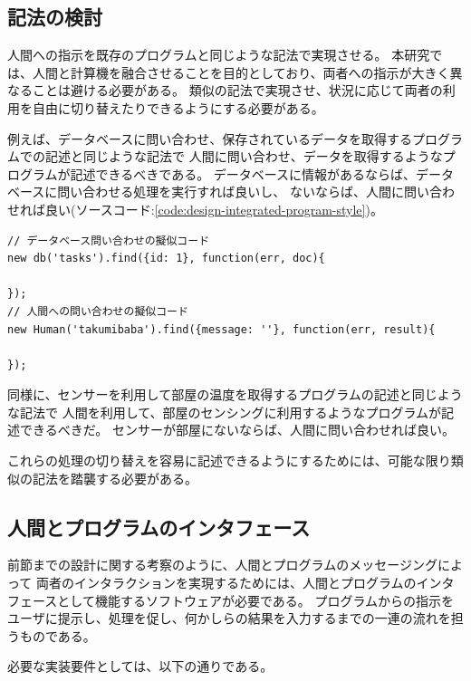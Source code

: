 \subsection{記法の検討}\label{ux8a18ux6cd5ux306eux691cux8a0e}

人間への指示を既存のプログラムと同じような記法で実現させる。
本研究では、人間と計算機を融合させることを目的としており、両者への指示が大きく異なることは避ける必要がある。
類似の記法で実現させ、状況に応じて両者の利用を自由に切り替えたりできるようにする必要がある。

例えば、データベースに問い合わせ、保存されているデータを取得するプログラムでの記述と同じような記法で
人間に問い合わせ、データを取得するようなプログラムが記述できるべきである。
データベースに情報があるならば、データベースに問い合わせる処理を実行すれば良いし、
ないならば、人間に問い合わせれば良い(ソースコード:\ref{code:design-integrated-program-style})。

\begin{lstlisting}[caption=人間への指示を計算機への指示と類似させる, label=code:design-integrated-program-style]
// データベース問い合わせの擬似コード
new db('tasks').find({id: 1}, function(err, doc){

});
// 人間への問い合わせの擬似コード
new Human('takumibaba').find({message: ''}, function(err, result){

});
\end{lstlisting}

同様に、センサーを利用して部屋の温度を取得するプログラムの記述と同じような記法で
人間を利用して、部屋のセンシングに利用するようなプログラムが記述できるべきだ。
センサーが部屋にないならば、人間に問い合わせれば良い。

これらの処理の切り替えを容易に記述できるようにするためには、可能な限り類似の記法を踏襲する必要がある。

\subsection{人間とプログラムのインタフェース}\label{ux4ebaux9593ux3068ux30d7ux30edux30b0ux30e9ux30e0ux306eux30a4ux30f3ux30bfux30d5ux30a7ux30fcux30b9}

前節までの設計に関する考察のように、人間とプログラムのメッセージングによって
両者のインタラクションを実現するためには、人間とプログラムのインタフェースとして機能するソフトウェアが必要である。
プログラムからの指示をユーザに提示し、処理を促し、何かしらの結果を入力するまでの一連の流れを担うものである。

必要な実装要件としては、以下の通りである。

